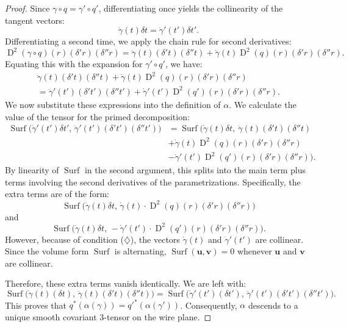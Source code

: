 \documentclass[10pt,letterpaper,reqno]{amsart}
\DeclareMathOperator{\D}{D} %
\DeclareMathOperator{\surf}{Surf}
\begin{document}
\begin{proof}
    Since $\gamma \circ q = \gamma' \circ q'$,
    differentiating once yields the collinearity of the tangent vectors:
    \begin{equation}\tag{$\diamondsuit$}
      \dot\gamma(t) \delta t = \dot\gamma'(t') \delta t'.
    \end{equation}
    Differentiating a second time,
    we apply the chain rule for second derivatives:
    $$
      \D^2(\gamma \circ q)(r)(\delta'r)(\delta''r) =
      \ddot\gamma(t)(\delta't)(\delta''t) + \dot\gamma(t) \D^2(q)(r)(\delta'r)(\delta''r).
      $$
    Equating this with the expansion for $\gamma' \circ q'$,
    we have:
    \begin{multline*}
      \ddot\gamma(t)(\delta't)(\delta''t) + \dot\gamma(t) \D^2(q)(r)(\delta'r)(\delta''r) \\
      =
      \ddot\gamma'(t') (\delta't')(\delta''t') + \dot\gamma'(t') \D^2(q')(r)(\delta'r)(\delta''r).
    \end{multline*}
    We now substitute these expressions into the definition of $\alpha$.
    We calculate the value of the tensor for the primed decomposition:
    \begin{align*}
      \surf\big(\dot\gamma'(t')\delta t', \, \ddot\gamma'(t')(\delta't')(\delta''t')\big)
      & =
      \surf\bigg(
      \dot\gamma(t)\delta t, \
      \ddot\gamma(t)(\delta't)(\delta''t) \\
      &  + \dot\gamma(t) \D^2(q)(r)(\delta'r)(\delta''r) \\
      &  - \dot\gamma'(t') \D^2(q')(r)(\delta'r)(\delta''r)
      \bigg).
    \end{align*}
    By linearity of $\surf$ in the second argument,
    this splits into the main term plus terms involving the second derivatives of the parametrizations.
    Specifically, the extra terms are of the form:
    $$
      \surf\big(\dot\gamma(t)\delta t, \, \dot\gamma(t) \cdot \D^2(q)(r)(\delta'r)(\delta''r) \big)
      $$
    and
    $$
      \surf\big(\dot\gamma(t)\delta t, \, -\dot\gamma'(t') \cdot \D^2(q')(r)(\delta'r)(\delta''r) \big).
      $$
    However,
    because of condition ($\diamondsuit$),
    the vectors $\dot\gamma(t)$ and $\dot\gamma'(t')$ are collinear.
    Since the volume form $\surf$ is alternating,
    $\surf(\mathbf{u}, \mathbf{v}) = 0$ whenever $\mathbf{u}$ and $\mathbf{v}$ are collinear.
    
    Therefore,
    these extra terms vanish identically.
    We are left with:
    $$
      \surf\big(\dot\gamma(t)(\delta t), \, \ddot\gamma(t)(\delta't)(\delta''t)\big) =
      \surf\big(\dot\gamma'(t')(\delta t'), \, \ddot\gamma'(t')(\delta't')(\delta''t')\big).
      $$
    This proves that $q^*(\alpha(\gamma)) = q'^*(\alpha(\gamma'))$.
    Consequently,
    $\alpha$ descends to a unique smooth covariant 3-tensor on the wire plane.
  \end{proof}
  
\end{document}
